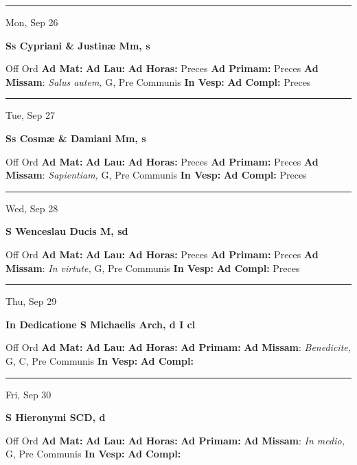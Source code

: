 \documentclass[letterpaper, 10pt]{article}
\begin{document}
\hrule
\begin{center}
Mon, Sep 26
\end{center}\textbf{ \large Ss Cypriani \& Justinæ Mm, \textnormal{\normalsize s}}
\begin{justify}
Off Ord
\textbf{Ad Mat: }
\textbf{Ad Lau: }
\textbf{Ad Horas: }Preces
\textbf{Ad Primam: }Preces
\textbf{Ad Missam}: \textit{Salus autem,} G, Pre Communis
\textbf{In Vesp: }
\textbf{Ad Compl: }Preces\end{justify}



\hrule
\begin{center}
Tue, Sep 27
\end{center}\textbf{ \large Ss Cosmæ \& Damiani Mm, \textnormal{\normalsize s}}
\begin{justify}
Off Ord
\textbf{Ad Mat: }
\textbf{Ad Lau: }
\textbf{Ad Horas: }Preces
\textbf{Ad Primam: }Preces
\textbf{Ad Missam}: \textit{Sapientiam,} G, Pre Communis
\textbf{In Vesp: }
\textbf{Ad Compl: }Preces\end{justify}



\hrule
\begin{center}
Wed, Sep 28
\end{center}\textbf{ \large S Wenceslau Ducis M, \textnormal{\normalsize sd}}
\begin{justify}
Off Ord
\textbf{Ad Mat: }
\textbf{Ad Lau: }
\textbf{Ad Horas: }Preces
\textbf{Ad Primam: }Preces
\textbf{Ad Missam}: \textit{In virtute,} G, Pre Communis
\textbf{In Vesp: }
\textbf{Ad Compl: }Preces\end{justify}



\hrule
\begin{center}
Thu, Sep 29
\end{center}\textbf{ \large In Dedicatione S Michaelis Arch, \textnormal{\normalsize d I cl}}
\begin{justify}
Off Ord
\textbf{Ad Mat: }
\textbf{Ad Lau: }
\textbf{Ad Horas: }
\textbf{Ad Primam: }
\textbf{Ad Missam}: \textit{Benedicite,} G, C, Pre Communis
\textbf{In Vesp: }
\textbf{Ad Compl: }\end{justify}



\hrule
\begin{center}
Fri, Sep 30
\end{center}\textbf{ \large S Hieronymi SCD, \textnormal{\normalsize d}}
\begin{justify}
Off Ord
\textbf{Ad Mat: }
\textbf{Ad Lau: }
\textbf{Ad Horas: }
\textbf{Ad Primam: }
\textbf{Ad Missam}: \textit{In medio,} G, Pre Communis
\textbf{In Vesp: }
\textbf{Ad Compl: }\end{justify}
\end{document}
